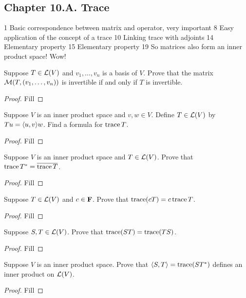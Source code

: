 \subsection*{Chapter 10.A. Trace}

1 Basic correspondence between matrix and operator, very important
8 Easy application of the concept of a trace 
10 Linking trace with adjoints
14 Elementary property
15 Elementary property
19 So matrices also form an inner product space! Wow!

\begin{exercise}{1}
  Suppose $T\in\mathcal{L}(V)$ and $v_1,\dots,v_n$ is a basis of $V$. Prove that the matrix $\mathcal{M}(T, (v_1,\dots,v_n))$ is invertible if and only if $T$ is invertible.
\end{exercise}
\begin{proof}
 Fill
\end{proof}

\begin{exercise}{8}
  Suppose $V$ is an inner product space and $v,w\in V$. Define $T\in\mathcal{L}(V)$ by $Tu=\langle u,v\rangle w$. Find a formula for $\operatorname*{trace} T$.
\end{exercise}
\begin{proof}
 Fill
\end{proof}

\begin{exercise}{10}
  Suppose $V$ is an inner product space and $T\in\mathcal{L}(V)$. Prove that $\operatorname*{trace} T^\ast =\overline{\operatorname*{trace} T}$.
\end{exercise}
\begin{proof}
 Fill
\end{proof}

\begin{exercise}{14}
  Suppose $T\in\mathcal{L}(V)$ and $c\in\mathbf{F}$. Prove that $\operatorname*{trace}(cT)=c\operatorname*{trace} T$.
\end{exercise}
\begin{proof}
 Fill
\end{proof}

\begin{exercise}{15}
  Suppose $S,T\in\mathcal{L}(V)$. Prove that $\operatorname*{trace}(ST)=\operatorname*{trace}(TS)$.
\end{exercise}
\begin{proof}
 Fill
\end{proof}

\begin{exercise}{19}
  Suppose $V$ is an inner product space. Prove that $\langle S,T\rangle=\operatorname*{trace}(ST^\ast)$ defines an inner product on $\mathcal{L}(V)$.
\end{exercise}
\begin{proof}
 Fill
\end{proof}